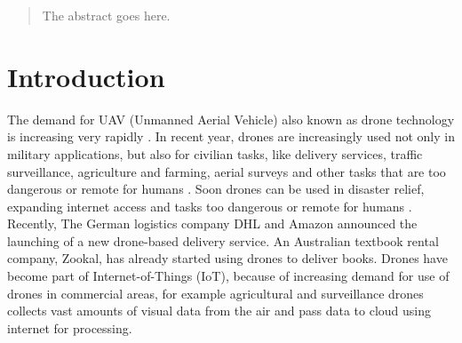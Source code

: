 \documentclass[conference]{IEEEtran}
\begin{document}




\maketitle

\begin{abstract}
The abstract goes here.
\end{abstract}





%


\section{Introduction}

The demand for UAV (Unmanned Aerial Vehicle) also known as drone technology is increasing very rapidly \cite{meyerson2015top}. 
In recent year, drones are increasingly used not only in military applications, but also for civilian tasks, like delivery services, traffic surveillance, agriculture and farming, aerial surveys and other tasks that are too dangerous or remote for humans \cite{David}. 
Soon drones can be used in disaster relief, expanding internet access and tasks too dangerous or remote for humans \cite{David}. 
Recently, The German logistics company DHL and Amazon announced the launching of a new drone-based delivery service.
An Australian textbook rental company, Zookal, has already started using drones to deliver
books. 
Drones have become part of Internet-of-Things (IoT), because of increasing demand for use of drones in commercial areas, for example agricultural and surveillance drones collects vast amounts of visual data from the air and pass data to cloud using internet for processing.
\end{document}
